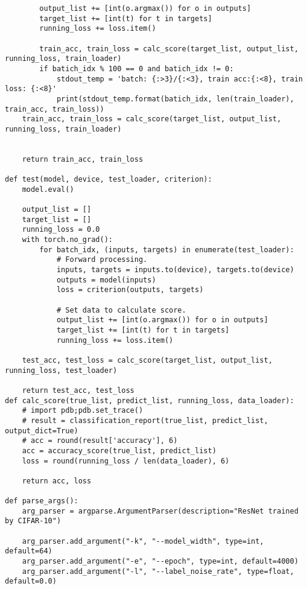 {\begin{verbatim}
        output_list += [int(o.argmax()) for o in outputs]
        target_list += [int(t) for t in targets]
        running_loss += loss.item()

        train_acc, train_loss = calc_score(target_list, output_list, running_loss, train_loader)
        if batich_idx % 100 == 0 and batich_idx != 0:
            stdout_temp = 'batch: {:>3}/{:<3}, train acc:{:<8}, train loss: {:<8}'
            print(stdout_temp.format(batich_idx, len(train_loader), train_acc, train_loss))
    train_acc, train_loss = calc_score(target_list, output_list, running_loss, train_loader)


    return train_acc, train_loss

def test(model, device, test_loader, criterion):
    model.eval()

    output_list = []
    target_list = []
    running_loss = 0.0
    with torch.no_grad():
        for batch_idx, (inputs, targets) in enumerate(test_loader):
            # Forward processing.
            inputs, targets = inputs.to(device), targets.to(device)
            outputs = model(inputs)
            loss = criterion(outputs, targets)

            # Set data to calculate score.
            output_list += [int(o.argmax()) for o in outputs]
            target_list += [int(t) for t in targets]
            running_loss += loss.item()

    test_acc, test_loss = calc_score(target_list, output_list, running_loss, test_loader)

    return test_acc, test_loss
def calc_score(true_list, predict_list, running_loss, data_loader):
    # import pdb;pdb.set_trace()
    # result = classification_report(true_list, predict_list, output_dict=True)
    # acc = round(result['accuracy'], 6)
    acc = accuracy_score(true_list, predict_list)
    loss = round(running_loss / len(data_loader), 6)

    return acc, loss

def parse_args():
    arg_parser = argparse.ArgumentParser(description="ResNet trained by CIFAR-10")
    
    arg_parser.add_argument("-k", "--model_width", type=int, default=64)
    arg_parser.add_argument("-e", "--epoch", type=int, default=4000)
    arg_parser.add_argument("-l", "--label_noise_rate", type=float, default=0.0)


\end{verbatim}}
